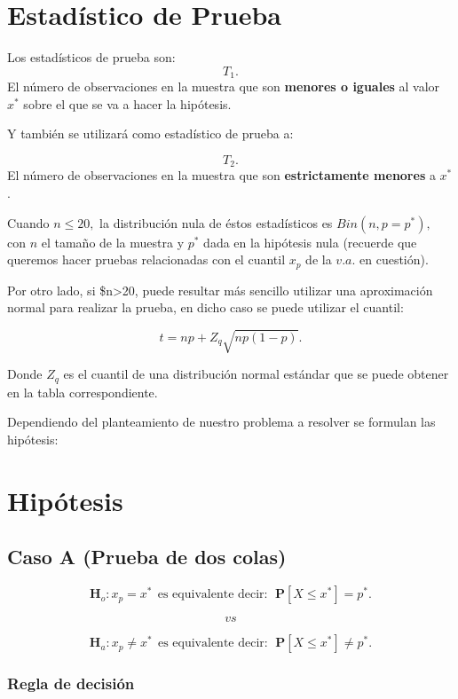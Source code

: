 \documentclass[
  a4paper,
  oneside,
  openany]{book}
\begin{document}
\hypertarget{estaduxedstico-de-prueba-1}{%
\section{Estadístico de Prueba}\label{estaduxedstico-de-prueba-1}}

Los estadísticos de prueba son:
\[T_{1}.\]
El número de observaciones en la muestra que son \textbf{menores o iguales} al valor \(x^*\) sobre el que se va a hacer la hipótesis.

Y también se utilizará como estadístico de prueba a:

\[T_{2}.\]
El número de observaciones en la muestra que son \textbf{estrictamente menores} a \(x^*\).

Cuando \(n\leq 20,\) la distribución nula de éstos estadísticos es \(Bin(n,p=p^*),\) con \(n\) el tamaño de la muestra y \(p^*\) dada en la hipótesis nula (recuerde que queremos hacer pruebas relacionadas con el cuantil \(x_{p}\) de la \(v.a.\) en cuestión).

Por otro lado, si \$n\textgreater20, puede resultar más sencillo utilizar una aproximación normal para realizar la prueba, en dicho caso se puede utilizar el cuantil:

\[
t=np+Z_{q}\sqrt{np(1-p)}.
\]

Donde \(Z_{q}\) es el cuantil de una distribución normal estándar que se puede obtener en la tabla correspondiente.

Dependiendo del planteamiento de nuestro problema a resolver se formulan las hipótesis:

\hypertarget{hipuxf3tesis-1}{%
\section{Hipótesis}\label{hipuxf3tesis-1}}

\hypertarget{caso-a-prueba-de-dos-colas-1}{%
\subsection*{Caso A (Prueba de dos colas)}\label{caso-a-prueba-de-dos-colas-1}}


\[\textbf{H}_{o}: x_{p} = x^* \ \ \mbox{es equivalente  decir}: \ \ \mathbf{P}[X \leq x^*]= p^*.\]

\[vs\]

\[\textbf{H}_a: x_{p} \neq x^* \ \ \mbox{es equivalente  decir}: \ \ \mathbf{P}[X \leq x^*]\neq p^*.\]

\hypertarget{regla-de-decisiuxf3n-3}{%
\subsubsection*{Regla de decisión}\label{regla-de-decisiuxf3n-3}}
\end{document}
